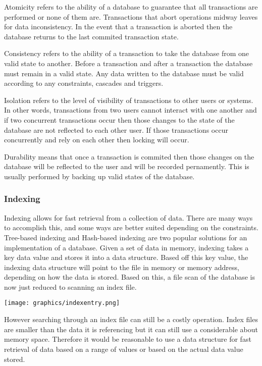 \documentclass[letterpaper, 12pt]{article}
\begin{document}
Atomicity refers to the ability of a database to guarantee that all transactions
are performed or none of them are. Transactions that abort operations midway leaves
for data inconsistency. In the event that a transaction is aborted then the database
returns to the last commited transaction state.

Consistency refers to the ability of a transaction to take the database from one valid state
to another. Before a transaction and after a transaction the database must remain in a valid state.
Any data written to the database must be valid according to any constraints, cascades and triggers.

Isolation refers to the level of visibility of transactions to other users or systems. In other words,
transactions from two users cannot interact with one another and if two concurrent transactions occur then
those changes to the state of the database are not reflected to each other user. If those transactions occur
concurrently and rely on each other then locking will occur.

Durability means that once a transaction is commited then those changes on the database will be reflected to the user
and will be recorded pernamently. This is usually performed by backing up valid states of the database.

\subsubsection{Indexing}
Indexing allows for fast retrieval from a collection of data. There are many ways to accomplish this,
and some ways are better suited depending on the constraints. Tree-based indexing and Hash-based indexing
are two popular solutions for an implementation of a database. Given a set of data in memory, indexing takes
a key data value and stores it into a data structure. Based off this key value, the indexing data structure
will point to the file in memory or memory address, depending on how the data is stored. Based on this, a
file scan of the database is now just reduced to scanning an index file.

\texttt{[image: graphics/indexentry.png]}
\cite{ramakrishnan2000database}

However searching through an index file can still be a costly operation. Index files are smaller than the
data it is referencing but it can still use a considerable about memory space. Therefore it would be
reasonable to use a data structure for fast retrieval of data based on a range of values or based on
the actual data value stored.
\end{document}
